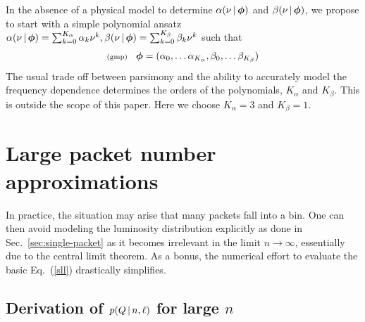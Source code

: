 \documentclass[11pt]{article}
\newcommand{\lleq}[1]{\label{#1} }
\renewcommand{\lleq}[1]{\label{#1} {\scriptstyle {\rm (#1)}} \hspace*{2ex} }
\newcommand{\cond}{\,|\,}
\newcommand{\refeq}[1]{Eq.~(\ref{#1})}
\newcommand{\refsec}[1]{Sec.~\ref{sec:#1}}
\newcommand{\Kalpha}{{K_\alpha}}
\newcommand{\Kbeta}{{K_\beta}}
\begin{document}
In the absence of a physical model to determine
$\alpha(\nu \cond \bmphi)$ and $\beta(\nu \cond \bmphi)$, we propose
to start with a simple polynomial ansatz
$\alpha(\nu \cond \bmphi) = \sum_{k=0}^\Kalpha \alpha_k \nu^k,
\beta(\nu \cond \bmphi) = \sum_{k=0}^\Kbeta \beta_k \nu^k$ such that
\begin{align}
  \lleq{gmp}
  \bmphi = (\alpha_0, \dots \alpha_\Kalpha , \beta_0, \dots \beta_\Kbeta)
\end{align}
The usual trade off between parsimony and the ability to accurately
model the frequency dependence determines the orders of the
polynomials, $\Kalpha$ and $\Kbeta$. This is outside the scope of this
paper. Here we choose $\Kalpha = 3$ and $\Kbeta = 1$.

\section{Large packet number approximations} \label{sec:asymptotic}

In practice, the situation may arise that many packets fall into a
bin. One can then avoid modeling the luminosity distribution
explicitly as done in \refsec{single-packet} as it becomes irrelevant
in the limit $n \to \infty$, essentially due to the central limit
theorem. As a bonus, the numerical effort to evaluate the basic
\refeq{sll} drastically simplifies.

\subsection{Derivation of $p(Q\,|\,n,\boldmath{\ell})$ for large $n$}
\end{document}
